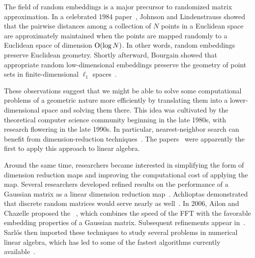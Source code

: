 \documentclass[final]{siamltex}
\newcounter{algorithm}[section]
\newcommand{\pgnotate}[1]{{\color{blue}[#1]}}
\begin{document}
The field of random embeddings is a major
precursor to randomized matrix approximation.
In a celebrated 1984
paper~\cite{JL84:Extensions-Lipschitz}, Johnson and Lindenstrauss
showed that the pairwise distances among a collection of $N$ points
in a Euclidean space are approximately maintained when the points
are mapped randomly to a Euclidean space of dimension $\mathrm{O}(\log
N)$. In other words, random embeddings preserve Euclidean geometry.
Shortly afterward, Bourgain showed that appropriate random
low-dimensional embeddings preserve the geometry of point sets in
finite-dimensional $\ell_1$ spaces~\cite{Bou85:Lipschitz-Embedding}.

These observations suggest that we might be able to solve some
computational problems of a geometric nature more efficiently by
translating them into a lower-dimensional space and solving them
there.  This idea was cultivated by the theoretical computer science
community beginning in the late 1980s, with research flowering in
the late 1990s. In particular, nearest-neighbor search can benefit
from dimension-reduction
techniques~\cite{IM98:Approximate-Nearest,Kle97:Two-Algorithms,KOR00:Efficient-Search}.
The papers~\cite{FKV98:Fast-Monte-Carlo,PRTV98:Latent-Semantic}
were apparently the first to apply this approach to linear algebra.

Around the same time, researchers became interested in simplifying
the form of dimension reduction maps and improving the computational
cost of applying the map.  Several researchers developed refined
results on the performance of a Gaussian matrix as a linear
dimension reduction
map~\cite{DG99:Elementary-Proof,IM98:Approximate-Nearest,Mat02:Lectures-Discrete}.
Achlioptas demonstrated that discrete random matrices would serve
nearly as well~\cite{Ach03:Database-Friendly}.
%
%
In 2006, Ailon and Chazelle proposed the ~\cite{AC06:Approximate-Nearest},
which combines the speed of the FFT with the favorable embedding
properties of a Gaussian matrix.
%
%
Subsequent refinements appear in~\cite{AL08:Fast-Dimension,%
LAS08:Dense-Fast}.  Sarl{\'o}s then imported these techniques to
study several problems in numerical linear algebra, which
has led to some of the fastest algorithms currently
available~\cite{2007_PNAS,random2}.
\end{document}
